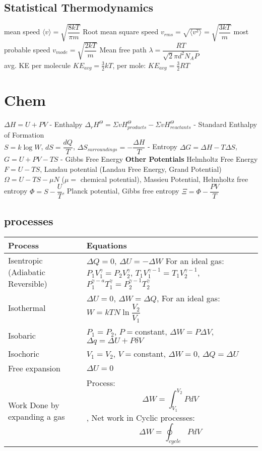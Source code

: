\documentclass[8pt]{extarticle}
\begin{document}
\begin{small}
\subsection{Statistical Thermodynamics}
mean speed $\langle v\rangle=\sqrt{\dfrac{8kT}{\pi m}}$ \hspace{.1in} Root mean square speed $v_{rms}=\sqrt{\langle v^2\rangle}=\sqrt{\dfrac{3kT}{m}}$ \hspace{.1in} most probable speed $v_{mode}=\sqrt{\dfrac{2kT}{m}}$ \hspace{.1in} Mean free path $\lambda=\dfrac{RT}{\sqrt{2}\pi d^2N_AP}$ \\
avg. KE per molecule $KE_{avg}=\frac{3}{2}kT$, per mole: $KE_{avg}=\frac{3}{2}RT$

\pagebreak
\section{Chem}
$\Delta H=U+PV$ - Enthalpy \hspace{0.1in}
$\Delta_rH^\Theta=\Sigma vH^\Theta_{products}-\Sigma vH^\Theta_{reactants}$ - Standard Enthalpy of Formation\\
$S=k\log W$, $dS=\dfrac{dQ}{T}$, $\Delta S_{surroundings}=-\dfrac{\Delta H}{T}$ - Entropy \hspace{0.1in} $\Delta G=\Delta H-T\Delta S$, $G=U+PV-TS$ - Gibbs Free Energy \hspace{.1in} \textbf{Other Potentials} Helmholtz Free Energy $F=U-TS$, Landau potential (Landau Free Energy, Grand Potential) $\Omega=U-TS-\mu N$ ($\mu=$ chemical potential), Massieu Potential, Helmholtz free entropy $\Phi=S-\dfrac{U}{T}$, Planck potential, Gibbs free entropy $\Xi=\Phi-\dfrac{PV}{T}$

\begin{multicols*}{2}
\section{processes}
\begin{tabular}{| p{2cm} | p{3cm} |}
\hline
Process & Equations\\
\hline
Isentropic (Adiabatic Reversible) & $\Delta Q=0$, $\Delta U=-\Delta W$ For an ideal gas: $P_1V_1^\gamma=P_2V_2^\gamma$, $T_1V_1^{\gamma-1}=T_1V_2^{\gamma-1}$, $P_1^{\gamma-a}T_1^\gamma=P_2^{\gamma-1}T_2^\gamma$ \\
\hline
Isothermal & $\Delta U=0$, $\Delta W=\Delta Q$, For an ideal gas: $W=kTN\ln\dfrac{V_2}{V_1}$\\
\hline
Isobaric & $P_1=P_2$, $P=$constant, $\Delta W=P\Delta V$, $\Delta q=\Delta U + P\delta V$ \\
\hline
Isochoric & $V_1=V_2$, $V=$constant, $\Delta W=0$, $\Delta Q=\Delta U$\\
\hline
Free expansion & $\Delta U=0$\\
\hline
Work Done by expanding a gas & Process: $$\Delta W=\int_{V_1}^{V_2} PdV$$, Net work in Cyclic processes: $$\Delta W=\oint_{cycle} PdV$$ \\
\hline
\end{tabular}



\end{multicols*}
\end{small}
\end{document}
